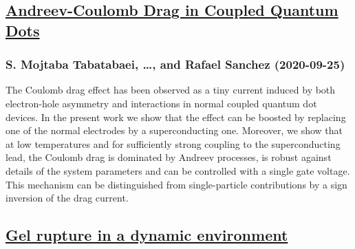 \subsection*{\href{http://arxiv.org/abs/2009.12398v1}{Andreev-Coulomb Drag in Coupled Quantum Dots}}
\subsubsection*{S. Mojtaba Tabatabaei, \dots, and Rafael Sanchez (2020-09-25)}
The Coulomb drag effect has been observed as a tiny current induced by both
electron-hole asymmetry and interactions in normal coupled quantum dot devices.
In the present work we show that the effect can be boosted by replacing one of
the normal electrodes by a superconducting one. Moreover, we show that at low
temperatures and for sufficiently strong coupling to the superconducting lead,
the Coulomb drag is dominated by Andreev processes, is robust against details
of the system parameters and can be controlled with a single gate voltage. This
mechanism can be distinguished from single-particle contributions by a sign
inversion of the drag current.

\subsection*{\href{http://arxiv.org/abs/2009.12396v1}{Gel rupture in a dynamic environment}}
